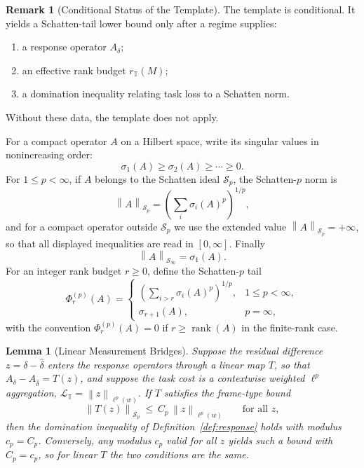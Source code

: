 \documentclass[12pt]{article}
\newtheorem{lemma}[theorem]{Lemma}
\theoremstyle{definition}
\newtheorem{remark}[theorem]{Remark}
\DeclareMathOperator{\rank}{rank}
\newcommand{\norm}[1]{\left\lVert#1\right\rVert}
\newcommand{\Sp}[1]{\mathcal S_{#1}}
\begin{document}
\begin{remark}[Conditional Status of the Template]
\label{rem:schatten-conditional-status}
The template is conditional.  It yields a Schatten-tail lower bound only after
a regime supplies:
\begin{enumerate}[label=(\arabic*)]
\item a response operator $A_\delta$;
\item an effective rank budget $r_{\mathbb T}(M)$;
\item a domination inequality relating task loss to a Schatten norm.
\end{enumerate}
Without these data, the template does not apply.
\end{remark}

For a compact operator $A$ on a Hilbert space, write its singular values in
nonincreasing order:
\[
\sigma_1(A)\ge\sigma_2(A)\ge\cdots\ge0.
\]
For $1\le p<\infty$, if $A$ belongs to the Schatten ideal $\mathcal S_p$, the
Schatten-$p$ norm is
\[
\norm{A}_{\Sp{p}}
=
\left(
\sum_i \sigma_i(A)^p
\right)^{1/p},
\]
and for a compact operator outside $\mathcal S_p$ we use the extended value
$\norm{A}_{\Sp{p}}=+\infty$, so that all displayed inequalities are read in
$[0,\infty]$.  Finally
\[
\norm{A}_{\Sp{\infty}}
=
\sigma_1(A).
\]
For an integer rank budget $r\ge0$, define the Schatten-$p$ tail
\[
\Phi^{(p)}_r(A)
=
\begin{cases}
\left(
\sum_{i>r}
\sigma_i(A)^p
\right)^{1/p},
& 1\le p<\infty,\\[2ex]
\sigma_{r+1}(A),
& p=\infty,
\end{cases}
\]
with the convention $\Phi^{(p)}_r(A)=0$ if $r\ge\rank(A)$ in the finite-rank
case.

\begin{lemma}[Linear Measurement Bridges]
\label{lem:frame-bridge}
Suppose the residual difference $z=\delta-\widehat\delta$ enters the response
operators through a \emph{linear} map $T$, so that
$A_\delta-A_{\widehat\delta}=T(z)$, and suppose the task cost is a contextwise
weighted $\ell^p$ aggregation, $\mathcal L_{\mathbb T}=\norm{z}_{\ell^p(w)}$.
If $T$ satisfies the frame-type bound
\[
\norm{T(z)}_{\Sp p}\ \le\ C_p\,\norm{z}_{\ell^p(w)}
\qquad\text{for all }z,
\]
then the domination inequality of Definition~\ref{def:response} holds with
modulus $c_p=C_p$.  Conversely, any modulus $c_p$ valid for all $z$ yields such
a bound with $C_p=c_p$, so for linear $T$ the two conditions are the same.
\end{lemma}
\end{document}
